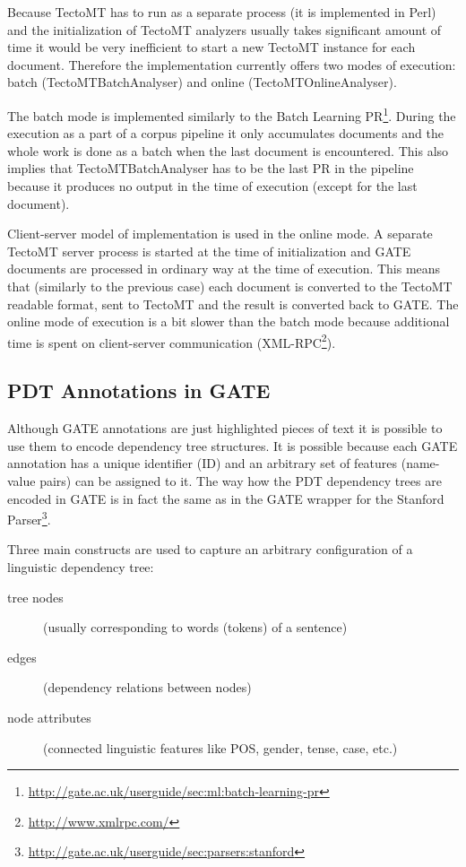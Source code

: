 Because TectoMT has to run as a separate process (it is implemented in Perl) and the initialization of TectoMT analyzers usually takes significant amount of time it would be very inefficient to start a new TectoMT instance for each document. Therefore the implementation currently offers two modes of execution: batch (TectoMTBatchAnalyser) and online (TectoMTOnlineAnalyser).

The batch mode is implemented similarly to the Batch Learning PR\footnote{\url{http://gate.ac.uk/userguide/sec:ml:batch-learning-pr}}. During the execution as a part of a corpus pipeline it only accumulates documents and the whole work is done as a batch when the last document is encountered. This also implies that TectoMTBatchAnalyser has to be the last PR in the pipeline because it produces no output in the time of execution (except for the last document). 

Client-server model of implementation is used in the online mode. A separate TectoMT server process is started at the time of initialization and GATE documents are processed in ordinary way at the time of execution. This means that (similarly to the previous case) each document is converted to the TectoMT readable format, sent to TectoMT and the result is converted back to GATE. The online mode of execution is a bit slower than the batch mode because additional time is spent on client-server communication (XML-RPC\footnote{\url{http://www.xmlrpc.com/}}).



\subsection{PDT Annotations in GATE} \label{sec:pdt_in_gate}

Although GATE annotations are just highlighted pieces of text it is possible to use them to encode dependency tree structures. It is possible because each GATE annotation has a unique identifier (ID) and an arbitrary set of features (name-value pairs) can be assigned to it. The way how the PDT dependency trees are encoded in GATE is in fact the same as in the GATE wrapper for the Stanford Parser\footnote{\url{http://gate.ac.uk/userguide/sec:parsers:stanford}}. 

Three main constructs are used to capture an arbitrary configuration of a linguistic dependency tree:


\begin{description}
	\item[tree nodes] (usually corresponding to words (tokens) of a sentence)
	\item[edges] (dependency relations between nodes)
	\item[node attributes] (connected linguistic features like POS, gender, tense, case, etc.)
\end{description}

